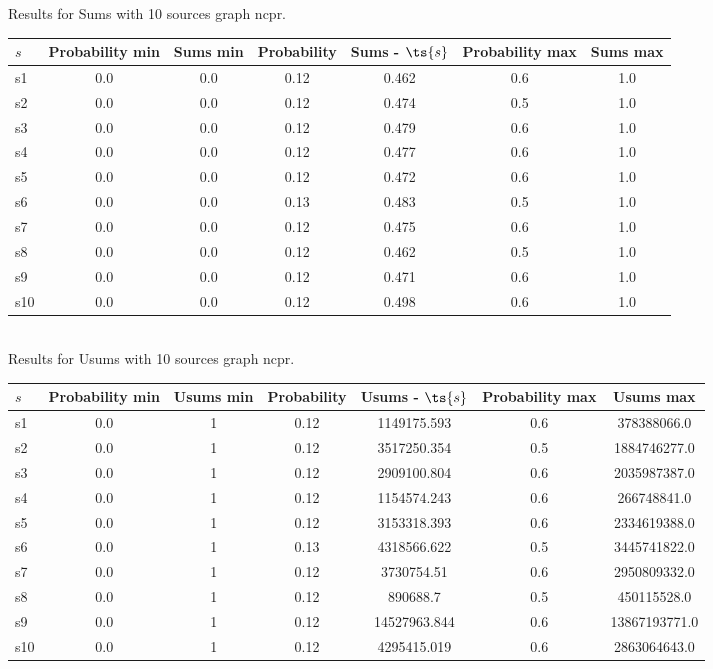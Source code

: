\documentclass{article}
\begin{document}
\noindent Results for Sums with 10 sources graph ncpr.

\noindent\begin{tabular}{|l|c|c|c|c|c|c|}
\hline
$s$& Probability min & Sums min & Probability & Sums - $\ts{s}$ & Probability max & Sums max\\
\hline
s1 &0.0 & 0.0 & 0.12 & 0.462 & 0.6 & 1.0\\
\hline
s2 &0.0 & 0.0 & 0.12 & 0.474 & 0.5 & 1.0\\
\hline
s3 &0.0 & 0.0 & 0.12 & 0.479 & 0.6 & 1.0\\
\hline
s4 &0.0 & 0.0 & 0.12 & 0.477 & 0.6 & 1.0\\
\hline
s5 &0.0 & 0.0 & 0.12 & 0.472 & 0.6 & 1.0\\
\hline
s6 &0.0 & 0.0 & 0.13 & 0.483 & 0.5 & 1.0\\
\hline
s7 &0.0 & 0.0 & 0.12 & 0.475 & 0.6 & 1.0\\
\hline
s8 &0.0 & 0.0 & 0.12 & 0.462 & 0.5 & 1.0\\
\hline
s9 &0.0 & 0.0 & 0.12 & 0.471 & 0.6 & 1.0\\
\hline
s10 &0.0 & 0.0 & 0.12 & 0.498 & 0.6 & 1.0\\
\hline
\end{tabular}\\

\noindent Results for Usums with 10 sources graph ncpr.

\noindent\begin{tabular}{|l|c|c|c|c|c|c|}
\hline
$s$& Probability min & Usums min & Probability & Usums - $\ts{s}$ & Probability max & Usums max\\
\hline
s1 &0.0 & 1 & 0.12 & 1149175.593 & 0.6 & 378388066.0\\
\hline
s2 &0.0 & 1 & 0.12 & 3517250.354 & 0.5 & 1884746277.0\\
\hline
s3 &0.0 & 1 & 0.12 & 2909100.804 & 0.6 & 2035987387.0\\
\hline
s4 &0.0 & 1 & 0.12 & 1154574.243 & 0.6 & 266748841.0\\
\hline
s5 &0.0 & 1 & 0.12 & 3153318.393 & 0.6 & 2334619388.0\\
\hline
s6 &0.0 & 1 & 0.13 & 4318566.622 & 0.5 & 3445741822.0\\
\hline
s7 &0.0 & 1 & 0.12 & 3730754.51 & 0.6 & 2950809332.0\\
\hline
s8 &0.0 & 1 & 0.12 & 890688.7 & 0.5 & 450115528.0\\
\hline
s9 &0.0 & 1 & 0.12 & 14527963.844 & 0.6 & 13867193771.0\\
\hline
s10 &0.0 & 1 & 0.12 & 4295415.019 & 0.6 & 2863064643.0\\
\hline
\end{tabular}\\
\end{document}
